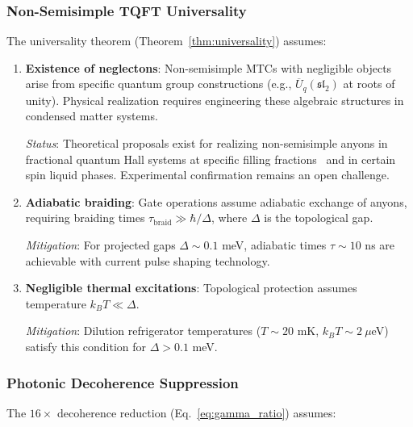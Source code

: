 \subsubsection{Non-Semisimple TQFT Universality}

The universality theorem (Theorem~\ref{thm:universality}) assumes:

\begin{enumerate}
\item \textbf{Existence of neglectons}: Non-semisimple MTCs with negligible objects arise from specific quantum group constructions (e.g., $\overline{U}_q(\mathfrak{sl}_2)$ at roots of unity). Physical realization requires engineering these algebraic structures in condensed matter systems.

\textit{Status}: Theoretical proposals exist for realizing non-semisimple anyons in fractional quantum Hall systems at specific filling fractions~\cite{Rowell2021} and in certain spin liquid phases. Experimental confirmation remains an open challenge.

\item \textbf{Adiabatic braiding}: Gate operations assume adiabatic exchange of anyons, requiring braiding times $\tau_{\mathrm{braid}} \gg \hbar / \Delta$, where $\Delta$ is the topological gap.

\textit{Mitigation}: For projected gaps $\Delta \sim 0.1$ meV, adiabatic times $\tau \sim 10$ ns are achievable with current pulse shaping technology.

\item \textbf{Negligible thermal excitations}: Topological protection assumes temperature $k_B T \ll \Delta$.

\textit{Mitigation}: Dilution refrigerator temperatures ($T \sim 20$ mK, $k_B T \sim 2~\mu$eV) satisfy this condition for $\Delta > 0.1$ meV.
\end{enumerate}

\subsubsection{Photonic Decoherence Suppression}

The $16\times$ decoherence reduction (Eq.~\ref{eq:gamma_ratio}) assumes:


